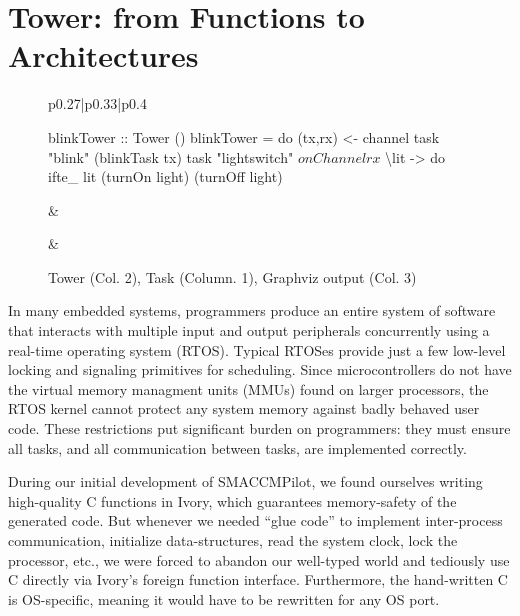 \section{Tower: from Functions to Architectures}
\label{sec:tower}

\begin{figure}[hbt!]
  \begin{tabular}{p{}|p{}|p{}}
    \begin{smcode}
blinkTower :: Tower ()
blinkTower = do
  (tx,rx) <- channel
  task "blink" (blinkTask tx)
  task "lightswitch" $
    onChannel rx $
      \textbackslash{}lit -> do
        ifte_ lit (turnOn light)
                  (turnOff light)
    \end{smcode}
&
&
  \end{tabular}
  \caption{Tower (Col. 2), Task (Column. 1), Graphviz output (Col. 3)}
  \label{fig:tower-ex}
\end{figure}


In many embedded systems, programmers produce an entire system of software
that interacts with multiple input and output peripherals concurrently using a
real-time operating system (RTOS). Typical RTOSes provide just a few low-level
locking and signaling primitives for scheduling. Since microcontrollers do not
have the virtual memory managment units (MMUs) found on larger processors, the
RTOS kernel cannot protect any system memory against badly behaved user code.
These restrictions put significant burden on programmers: they must ensure all
tasks, and all communication between tasks, are implemented correctly.

During our initial development of SMACCMPilot, we found ourselves writing
high-quality C functions in Ivory, which guarantees memory-safety of the
generated code. But whenever we needed
``glue code'' to implement inter-process communication, initialize
data-structures, read the system clock, lock the processor, etc., we were forced
to abandon our well-typed world and tediously use C directly via Ivory's foreign
function interface.  Furthermore, the hand-written C is OS-specific, meaning it
would have to be rewritten for any OS port.

